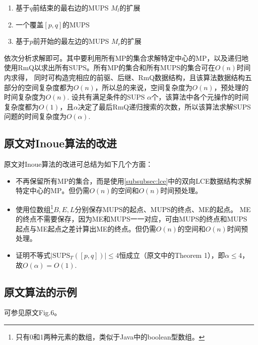 \begin{enumerate}
    \item 基于$q$前结束的最右边的MUPS $M_l$的扩展
    \item 一个覆盖$[p,q]$的MUPS
    \item 基于$p$前开始的最左边的MUPS $M_r$的扩展
\end{enumerate}
依次分析求解即可。其中要利用所有MP的集合求解特定中心的MP，以及递归地使用RmQ以求出所有SUPS。所有MP的集合和所有MUPS的集合可在$O(n)$时间内求得\cite{Inoue2018,Manacher75}，
同时可构造完相应的前驱、后继、RmQ数据结构，且该算法数据结构五部分的空间复杂度都为$O(n)$，所以总的来说，空间复杂度为$O(n)$，预处理的时间复杂度为$O(n)$.
设共有满足条件的SUPS $\alpha$个，该算法中各个元操作的时间复杂度都为$O(1)$，且$\alpha$决定了最后RmQ递归搜索的次数，所以该算法求解SUPS问题的时间复杂度为$O(\alpha)$.

\subsection{原文对Inoue算法的改进}\label{subsec:progress}

原文对Inoue算法的改进可总结为如下几个方面：
\begin{itemize}
    \item 不再保留所有MP的集合，而是使用\ref{subsubsec:lce}中的双向LCE数据结构求解特定中心的MP。但仍需$O(n)$的空间和$O(n)$时间预处理。
    \item 使用位数组\footnote{只有0和1两种元素的数组，类似于Java中的boolean型数组。}$B, E, L$分别保存MUPS的起点、MUPS的终点、ME的起点。
    ME的终点不需要保存，因为ME和MUPS一一对应，可由MUPS的终点和MUPS起点与ME起点之差计算出ME的终点。但仍需$O(n)$的空间和$O(n)$时间预处理。
    \item 证明不等式$|\mathrm{SUPS}_T ([p,q])| \leq 4$恒成立（原文中的Theorem 1），即$\alpha \leq 4$，故$O(\alpha) = O(1)$.
\end{itemize}

\subsection{原文算法的示例}\label{subsec:example}

可参见原文Fig.6。
